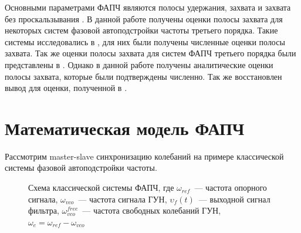 \documentclass[a4paper,article,14pt]{extarticle}
\begin{document}
Основными параметрами ФАПЧ являются полосы удержания, захвата и захвата без проскальзывания \cite{shahgildyan}. В данной работе получены оценки полосы захвата для некоторых систем фазовой автоподстройки частоты третьего порядка. Такие системы исследовались в \cite{kuznetsov_article}, для них были получены численные оценки полосы захвата. Так же оценки полосы захвата для систем ФАПЧ третьего порядка были представлены в \cite{kuznetsov}. Однако в данной работе получены аналитические оценки полосы захвата, которые были подтверждены численно. Так же восстановлен вывод для оценки, полученной в \cite{kuznetsov}.


\newpage
\section{Математическая модель ФАПЧ}
Рассмотрим master-slave синхронизацию колебаний на примере классической системы фазовой автоподстройки частоты.
\begin{figure}[H]
\begin{center}
\end{center}
\caption{Схема классической системы ФАПЧ, где $\omega_{ref}$~--- частота опорного сигнала, $\omega_{vco}$~--- частота сигнала ГУН, $\upsilon_f(t)$~--- выходной сигнал фильтра, $\omega_{vco}^{free}$~--- частота свободных колебаний ГУН, $\omega_e = \omega_{ref}-\omega_{vco}$}
\end{figure}
\end{document}
